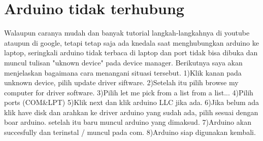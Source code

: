 \section{Arduino tidak terhubung}
Walaupun caranya mudah dan banyak tutorial langkah-langkahnya di youtube ataupun di google, tetapi tetap saja ada knedala saat menghubungkan arduino ke laptop, seringkali arduino tidak terbaca di laptop dan port tidak bisa dibuka dan muncul tulisan "uknown device" pada device manager.
Berikutnya saya akan menjelaskan bagaimana cara menangani situasi tersebut.
1)Klik kanan pada unknown device, pilih update driver siftware.
2)Setelah itu pilih browse my computer for driver software.
3)Pilih let me pick from a list from a list...
4)Pilih ports (COM&LPT)
5)Klik next dan klik arduino LLC jika ada.
6)Jika belum ada klik have disk dan arahkan ke driver arduino yang sudah ada, pilih sesuai dengan boar arduino. setelah itu baru muncul arduino yang dimaksud.
7)Arduino akan succesfully dan terinstal / muncul pada com.
8)Arduino siap digunakan kembali.